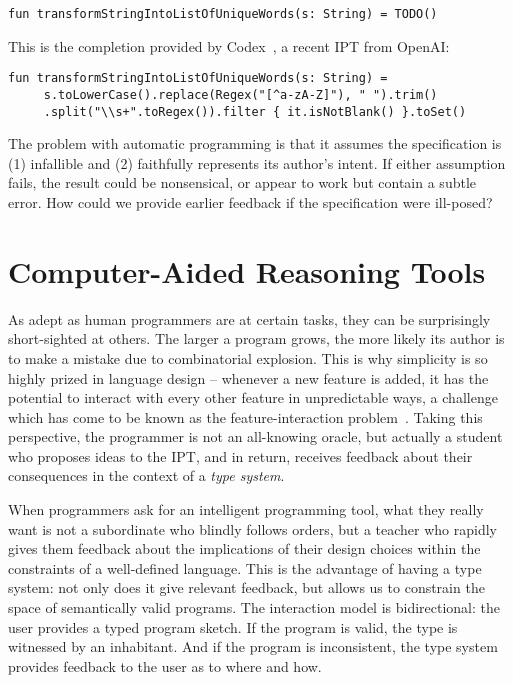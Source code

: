 \documentclass[10pt]{article}
\begin{document}
\begin{lstlisting}[basicstyle=\small\ttfamily]
  fun transformStringIntoListOfUniqueWords(s: String) = TODO()
\end{lstlisting}

\noindent This is the completion provided by Codex~\cite{chen2021evaluating}, a recent IPT from OpenAI:

\begin{lstlisting}[basicstyle=\small\ttfamily]
  fun transformStringIntoListOfUniqueWords(s: String) =
     s.toLowerCase().replace(Regex("[^a-zA-Z]"), " ").trim()
     .split("\\s+".toRegex()).filter { it.isNotBlank() }.toSet()
\end{lstlisting}

\noindent The problem with automatic programming is that it assumes the specification is (1) infallible and (2) faithfully represents its author's intent. If either assumption fails, the result could be nonsensical, or appear to work but contain a subtle error. How could we provide earlier feedback if the specification were ill-posed?

\section{Computer-Aided Reasoning Tools}\label{sec:computer-aided-reasoning-tools}

As adept as human programmers are at certain tasks, they can be surprisingly short-sighted at others. The larger a program grows, the more likely its author is to make a mistake due to combinatorial explosion. This is why simplicity is so highly prized in language design -- whenever a new feature is added, it has the potential to interact with every other feature in unpredictable ways, a challenge which has come to be known as the feature-interaction problem~\cite{apel2013exploring}. Taking this perspective, the programmer is not an all-knowing oracle, but actually a student who proposes ideas to the IPT, and in return, receives feedback about their consequences in the context of a \textit{type system}.

When programmers ask for an intelligent programming tool, what they really want is not a subordinate who blindly follows orders, but a teacher who rapidly gives them feedback about the implications of their design choices within the constraints of a well-defined language. This is the advantage of having a type system: not only does it give relevant feedback, but allows us to constrain the space of semantically valid programs. The interaction model is bidirectional: the user provides a typed program sketch. If the program is valid, the type is witnessed by an inhabitant. And if the program is inconsistent, the type system provides feedback to the user as to where and how.
\end{document}
